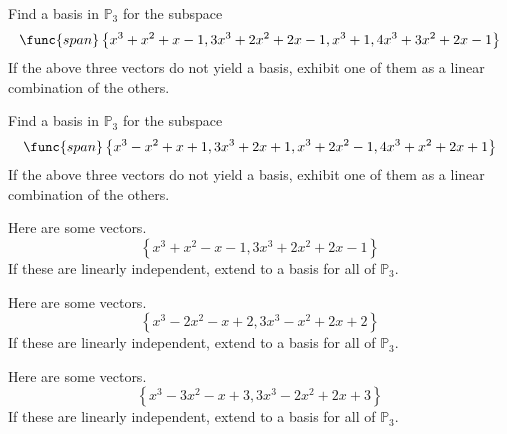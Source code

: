\begin{enumialphparenastyle}
\begin{ex} Find a basis in $\mathbb{P}_{3}$ for the subspace 
\begin{equation*}
\func{span}\left\{
x^{3}+x^{2}+x-1,3x^{3}+2x^{2}+2x-1,x^{3}+1,4x^{3}+3x^{2}+2x-1\right\}
\end{equation*}
If the above three vectors do not yield a basis, exhibit one
of them as a linear combination of the others.
\end{ex}


\begin{ex} Find a basis in $\mathbb{P}_{3}$ for the subspace 
\begin{equation*}
\func{span}\left\{
x^{3}-x^{2}+x+1,3x^{3}+2x+1,x^{3}+2x^{2}-1,4x^{3}+x^{2}+2x+1\right\}
\end{equation*}
If the above three vectors do not yield a basis, exhibit one
of them as a linear combination of the others.
\end{ex}


\begin{ex} Here are some vectors.
\begin{equation*}
\left\{ x^{3}+x^{2}-x-1,3x^{3}+2x^{2}+2x-1\right\}
\end{equation*}
If these are linearly independent, extend to a basis for all of $\mathbb{P}
_{3}$.
\end{ex}


\begin{ex} Here are some vectors.
\begin{equation*}
\left\{ x^{3}-2x^{2}-x+2,3x^{3}-x^{2}+2x+2\right\}
\end{equation*}
If these are linearly independent, extend to a basis for all of $\mathbb{P}
_{3}$.
\end{ex}


\begin{ex} Here are some vectors.
\begin{equation*}
\left\{ x^{3}-3x^{2}-x+3,3x^{3}-2x^{2}+2x+3\right\}
\end{equation*}
If these are linearly independent, extend to a basis for all of $\mathbb{P}
_{3}$.
\end{ex}



\end{enumialphparenastyle}
